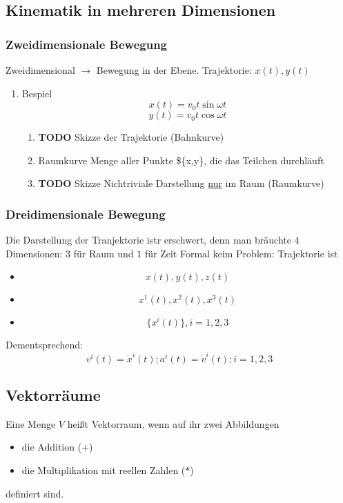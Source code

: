 \documentclass[11pt]{article}
\begin{document}
\subsection{Kinematik in mehreren Dimensionen}
\label{sec-1-3}
\subsubsection{Zweidimensionale Bewegung}
\label{sec-1-3-1}
Zweidimensional $\rightarrow$ Bewegung in der Ebene. Trajektorie: $x(t),y(t)$
\begin{enumerate}
\item Bespiel
\label{sec-1-3-1-1}
\[x(t) = v_0 t \sin{\omega t}\]
\[y(t) = v_0 t \cos{\omega t}\]
\begin{enumerate}
\item {\bfseries\sffamily TODO} Skizze der Trajektorie (Bahnkurve)
\label{sec-1-3-1-1-1}
\item Raumkurve
\label{sec-1-3-1-1-2}
Menge aller Punkte \$\{x,y\}, die das Teilchen durchläuft
\item {\bfseries\sffamily TODO} Skizze Nichtriviale Darstellung \underline{nur} im Raum (Raumkurve)
\label{sec-1-3-1-1-3}
\end{enumerate}
\end{enumerate}
\subsubsection{Dreidimensionale Bewegung}
\label{sec-1-3-2}
Die Darstellung der Tranjektorie istr erschwert, denn man bräuchte $4$ Dimensionen: $3$ für Raum und $1$ für Zeit
Formal keim Problem: Trajektorie ist
\begin{itemize}
\item \[x(t),y(t),z(t)\]
\item \[x^1(t),x^2(t),x^3(t)\]
\item \[\{x^i(t)\},i=1,2,3\]
\end{itemize}

Dementsprechend:
\[v^i(t) = \dot{x}^i(t); a^i(t) = \dot{v}^i(t); i=1,2,3\]
\subsection{Vektorräume}
\label{sec-1-4}
Eine Menge $V$ heißt Vektorraum, wenn auf ihr zwei Abbildungen
\begin{itemize}
\item die Addition ($+$)
\item die Multiplikation mit reellen Zahlen ($*$)
\end{itemize}
definiert sind.
\end{document}
